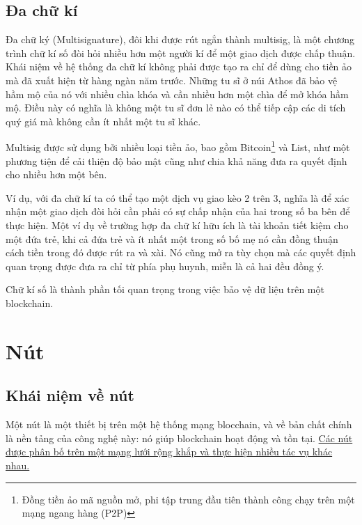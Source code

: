  \subsection{Đa chữ kí}
 Đa chữ ký (Multisignature), đôi khi được rút ngắn thành multisig, là một chương trình chữ kí số đòi hỏi nhiều hơn một người kí để một giao dịch được chấp thuận. Khái niệm về hệ thống đa chữ kí không phải được tạo ra chỉ để dùng cho tiền ảo mà đã xuất hiện từ hàng ngàn năm trước.  Những tu sĩ ở núi Athos đã bảo vệ hầm mộ của nó với nhiều chìa khóa và cần nhiều hơn một chìa để mở khóa hầm mộ. Điều này có nghĩa là không một tu sĩ đơn lẻ nào có thể tiếp cập các di tích quý giá mà không cần ít nhất một tu sĩ khác.
 
Multisig được sử dụng bởi nhiều loại tiền ảo, bao gồm Bitcoin\footnote{Đồng tiền ảo mã nguồn mở, phi tập trung đầu tiên thành công chạy trên một mạng ngang hàng (P2P)} và List, như một phương tiện để cải thiện độ bảo mật cũng như chia khả năng đưa ra quyết định cho nhiều hơn một bên. 
 
 Ví dụ, với đa chữ kí ta có thể tạo một dịch vụ giao kèo 2 trên 3, nghĩa là để xác nhận một giao dịch đòi hỏi cần phải có sự chấp nhận của hai trong số ba bên để thực hiện. Một ví dụ về trường hợp đa chữ kí hữu ích là tài khoản tiết kiệm cho một đứa trẻ, khi cả đứa trẻ và ít nhất một trong số bố mẹ nó cần đồng thuận cách tiền trong đó được rút ra và xài. Nó cũng mở ra tùy chọn mà các quyết định quan trọng được đưa ra chỉ từ phía phụ huynh, miễn là cả hai đều đồng ý.
 
Chữ kí số là thành phần tối quan trọng trong việc bảo vệ dữ liệu trên một blockchain.

\section{Nút}
\subsection{Khái niệm về nút}

Một nút là một thiết bị trên một hệ thống mạng blocchain, và về bản chất chính là nền tảng của công nghệ này: nó giúp blockchain hoạt động và tồn tại. \underline{Các nút được phân bố trên một mạng lưới rộng khắp và thực hiện nhiều tác vụ khác nhau.}

